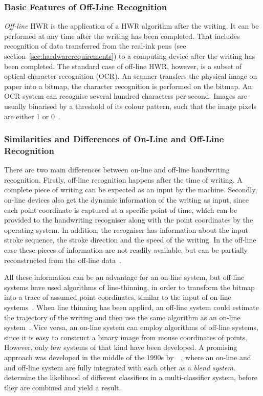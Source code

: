\subsubsection{Basic Features of Off-Line Recognition}
\label{sec:basicfeaturesofofflinerecognition}

\emph{Off-line} HWR is the application of a HWR algorithm after the writing.
It can be performed at any time after the writing has been completed. That 
includes recognition of data transferred from the real-ink pens 
(see section~\ref{sec:hardwarerequirements}) to a computing device after the 
writing has been completed. The standard case of off-line HWR, however, is a 
subset of optical character recognition (OCR). An scanner transfers the physical 
image on paper into a bitmap, the character recognition is performed on the 
bitmap.
An OCR system can recognise several hundred characters per second. Images are
usually binarised by a threshold of its colour pattern, such that the image
pixels are either 1 or 0~.

\subsubsection[Similarities and Differences]{Similarities and Differences of On-Line and Off-Line  Recognition}
\label{sec:similaritiesanddifferences}

There are two main differences between on-line and off-line handwriting
recognition. Firstly, off-line recognition happens
after the time of writing. A complete piece of writing can be 
expected as an input by the machine. Secondly, on-line devices also get the
dynamic information of the writing as input, since each point coordinate 
is captured at a specific point of time, which can be provided to the 
handwriting recogniser along with the point coordinates by the operating system.
In addition, the recogniser has information about the input stroke sequence, 
the stroke direction and the speed of the writing. In the off-line case these 
pieces of information are not readily available, but can be partially 
reconstructed from the off-line data~.

All these information can be an advantage for an on-line system,
but off-line systems have used algorithms of line-thinning, in order to
transform the bitmap into a trace of assumed point coordinates, 
similar to the input of on-line systems~. 
When line thinning has been applied, an off-line 
system could estimate the trajectory of the writing and then use the same 
algorithm as an on-line system~. 
Vice versa, an on-line system can employ algorithms of off-line systems, 
since it is easy to construct a binary image from mouse coordinates 
of points. However, only few systems of that kind have been developed. 
A promising approach was developed in the middle of the 1990s 
by~~\citeyear{Nishida1995}, 
where an on-line and and off-line system are 
fully integrated with each other as a \emph{blend system}.
~\citeyear{Velek2002a} determine the likelihood of 
different classifiers in a multi-classifier system, 
before they are combined and yield a result.

